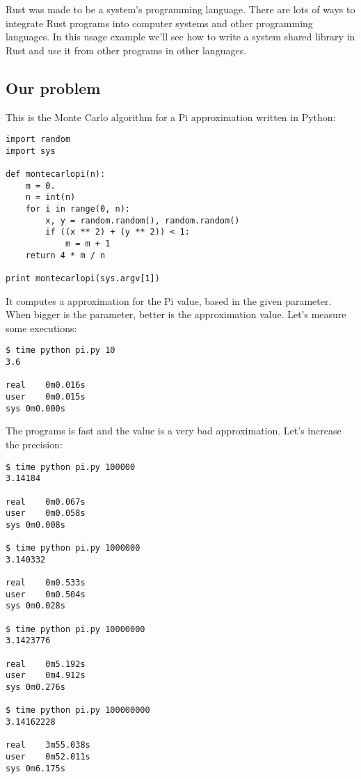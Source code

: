 Rust was made to be a system's programming language. There are lots of ways to
integrate Rust programs into computer systems and other programming languages.
In this usage example we'll see how to write a system shared library in Rust and
use it from other programs in other languages.

\subsection{Our problem}

This is the Monte Carlo algorithm for a Pi approximation 
 \cite{8_1} written in Python:

\begin{lstlisting}[label=pytthth,caption=Python Monte Carlo algorithm]
import random
import sys

def montecarlopi(n):
    m = 0.
    n = int(n)
    for i in range(0, n):
        x, y = random.random(), random.random()
        if ((x ** 2) + (y ** 2)) < 1:
            m = m + 1
    return 4 * m / n

print montecarlopi(sys.argv[1])
\end{lstlisting}

It computes a approximation for the Pi value, based in the given parameter. When
bigger is the parameter, better is the approximation value. Let's measure some
executions:

\begin{verbatim}
$ time python pi.py 10
3.6

real    0m0.016s
user    0m0.015s
sys 0m0.000s
\end{verbatim}

The programs is fast and the value is a very bad approximation. Let's increase
the precision:

\begin{verbatim}
$ time python pi.py 100000
3.14184

real    0m0.067s
user    0m0.058s
sys 0m0.008s

$ time python pi.py 1000000
3.140332

real    0m0.533s
user    0m0.504s
sys 0m0.028s

$ time python pi.py 10000000
3.1423776

real    0m5.192s
user    0m4.912s
sys 0m0.276s

$ time python pi.py 100000000
3.14162228

real    3m55.038s
user    0m52.011s
sys 0m6.175s
\end{verbatim}

